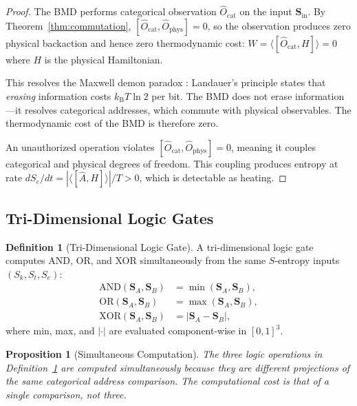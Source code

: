 \documentclass[twocolumn,10pt]{article}
\newtheorem{proposition}[theorem]{Proposition}
\theoremstyle{definition}
\newtheorem{definition}[theorem]{Definition}
\theoremstyle{remark}
\newcommand{\Sk}{S_k}
\newcommand{\St}{S_t}
\newcommand{\Se}{S_e}
\newcommand{\kB}{k_{\mathrm{B}}}
\newcommand{\Ocat}{\hat{O}_{\mathrm{cat}}}
\newcommand{\Ophys}{\hat{O}_{\mathrm{phys}}}
\begin{document}
\begin{proof}
The BMD performs categorical observation $\Ocat$ on the input $\mathbf{S}_{\mathrm{in}}$. By Theorem~\ref{thm:commutation}, $[\Ocat, \Ophys] = 0$, so the observation produces zero physical backaction and hence zero thermodynamic cost: $W = \langle[\Ocat, H]\rangle = 0$ where $H$ is the physical Hamiltonian.

This resolves the Maxwell demon paradox \cite{bennett1982thermodynamics, landauer1961irreversibility}: Landauer's principle states that \emph{erasing} information costs $\kB T \ln 2$ per bit. The BMD does not erase information---it resolves categorical addresses, which commute with physical observables. The thermodynamic cost of the BMD is therefore zero.

An unauthorized operation violates $[\Ocat, \Ophys] = 0$, meaning it couples categorical and physical degrees of freedom. This coupling produces entropy at rate $d\Se/dt = |\langle[\hat{A}, H]\rangle|/T > 0$, which is detectable as heating.
\end{proof}

\subsection{Tri-Dimensional Logic Gates}

\begin{definition}[Tri-Dimensional Logic Gate]
\label{def:tri_gate}
A tri-dimensional logic gate computes AND, OR, and XOR simultaneously from the same $S$-entropy inputs $(\Sk, \St, \Se)$:
\begin{align}
  \mathrm{AND}(\mathbf{S}_A, \mathbf{S}_B) &= \min(\mathbf{S}_A, \mathbf{S}_B), \label{eq:tri_and} \\
  \mathrm{OR}(\mathbf{S}_A, \mathbf{S}_B) &= \max(\mathbf{S}_A, \mathbf{S}_B), \label{eq:tri_or} \\
  \mathrm{XOR}(\mathbf{S}_A, \mathbf{S}_B) &= |\mathbf{S}_A - \mathbf{S}_B|, \label{eq:tri_xor}
\end{align}
where min, max, and $|\cdot|$ are evaluated component-wise in $[0,1]^3$.
\end{definition}

\begin{proposition}[Simultaneous Computation]
\label{prop:simultaneous}
The three logic operations in Definition~\ref{def:tri_gate} are computed simultaneously because they are different projections of the same categorical address comparison. The computational cost is that of a single comparison, not three.
\end{proposition}
\end{document}
